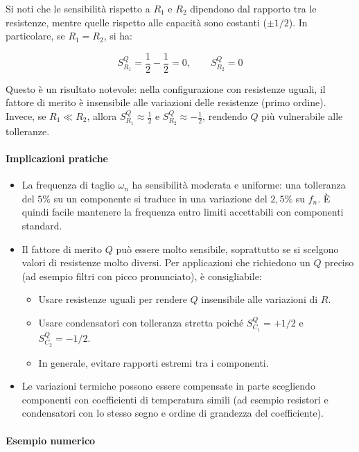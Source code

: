Si noti che le sensibilità rispetto a \(R_1\) e \(R_2\) dipendono dal rapporto tra le resistenze, mentre quelle rispetto alle capacità sono costanti (\(\pm 1/2\)). In particolare, se \(R_1 = R_2\), si ha:

\begin{equation}
S_{R_1}^{Q} = \frac{1}{2} - \frac{1}{2} = 0,\qquad S_{R_2}^{Q} = 0
\label{eq:S_R_uguali}
\end{equation}

Questo è un risultato notevole: nella configurazione con resistenze uguali, il fattore di merito è insensibile alle variazioni delle resistenze (primo ordine). Invece, se \(R_1 \ll R_2\), allora \(S_{R_1}^{Q} \approx \frac{1}{2}\) e \(S_{R_2}^{Q} \approx -\frac{1}{2}\), rendendo \(Q\) più vulnerabile alle tolleranze.

\paragraph{Implicazioni pratiche}

\begin{itemize}
\item La frequenza di taglio \(\omega_n\) ha sensibilità moderata e uniforme: una tolleranza del \(5\%\) su un componente si traduce in una variazione del \(2,5\%\) su \(f_n\). È quindi facile mantenere la frequenza entro limiti accettabili con componenti standard.
\item Il fattore di merito \(Q\) può essere molto sensibile, soprattutto se si scelgono valori di resistenze molto diversi. Per applicazioni che richiedono un \(Q\) preciso (ad esempio filtri con picco pronunciato), è consigliabile:
\begin{itemize}
    \item Usare resistenze uguali per rendere \(Q\) insensibile alle variazioni di \(R\).
    \item Usare condensatori con tolleranza stretta poiché \(S_{C_1}^{Q} = +1/2\) e \(S_{C_2}^{Q} = -1/2\).
    \item In generale, evitare rapporti estremi tra i componenti.
\end{itemize}
\item Le variazioni termiche possono essere compensate in parte scegliendo componenti con coefficienti di temperatura simili (ad esempio resistori e condensatori con lo stesso segno e ordine di grandezza del coefficiente).
\end{itemize}

\paragraph{Esempio numerico}

